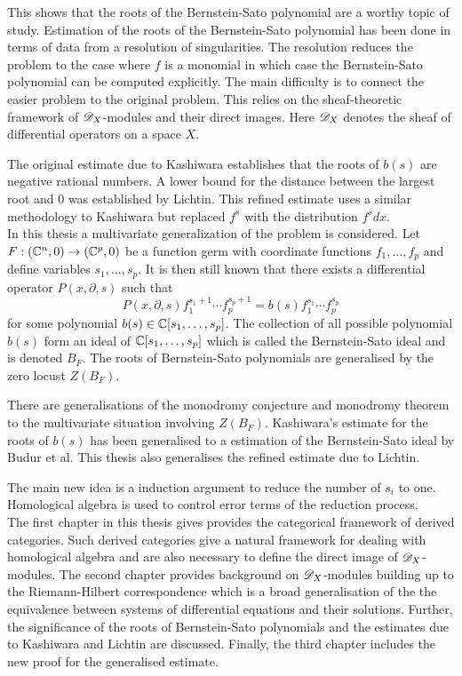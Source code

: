 This shows that the roots of the Bernstein-Sato polynomial are a worthy topic of study.
Estimation of the roots of the Bernstein-Sato polynomial has been done in terms of data from a resolution of singularities.
The resolution reduces the problem to the case where $f$ is a monomial in which case the Bernstein-Sato polynomial can be computed explicitly.
The main difficulty is to connect the easier problem to the original problem.
This relies on the sheaf-theoretic framework of $\mathscr{D}_X$-modules and their direct images.
Here $\mathscr{D}_X$ denotes the sheaf of differential operators on a space $X$.

The original estimate due to Kashiwara establishes that the roots of $b(s)$ are negative rational numbers.
A lower bound for the distance between the largest root and $0$ was established by Lichtin.
This refined estimate uses a similar methodology to Kashiwara but replaced $f^s$ with the distribution $f^s dx$.
\\

In this thesis a multivariate generalization of the problem is considered.
Let $F:(\mathbb{C}^{n},0)\to (\mathbb{C}^p,0)$ be a function germ with coordinate functions $f_1,\ldots, f_p$ and define variables $s_1,\ldots, s_p$.
It is then still known that there exists a differential operator $P(x,\partial, s)$ such that
$$P(x,\partial,s) f_1^{s_1 + 1}\cdots f_p^{s_p + 1} = b(s)f_1^{s_1}\cdots f_p^{s_p}$$
for some polynomial $b(s) \in \mathbb{C}[s_1,\ldots, s_p]$.
The collection of all possible polynomial $b(s)$ form an ideal of $\mathbb{C}[s_1,\ldots,s_p]$ which is called the Bernstein-Sato ideal and is denoted $B_{F}$.
The roots of Bernstein-Sato polynomials are generalised by the zero locust $Z(B_F)$.

There are generalisations of the monodromy conjecture and monodromy theorem to the multivariate situation involving $Z(B_F)$.
Kashiwara's estimate for the roots of $b(s)$ has been generalised to a estimation of the Bernstein-Sato ideal by Budur et al.
This thesis also generalises the refined estimate due to Lichtin.

The main new idea is a induction argument to reduce the number of $s_i$ to one.
Homological algebra is used to control error terms of the reduction process.
\\

The first chapter in this thesis gives provides the categorical framework of derived categories.
Such derived categories give a natural framework for dealing with homological algebra and are also necessary to define the direct image of $\mathscr{D}_X$-modules.
The second chapter provides background on $\mathscr{D}_X$-modules building up to the Riemann-Hilbert correspondence which is a broad generalisation of the the equivalence between systems of differential equations and their solutions.
Further, the significance of the roots of Bernstein-Sato polynomials and the estimates due to Kashiwara and Lichtin are discussed.
Finally, the third chapter includes the new proof for the generalised estimate.
